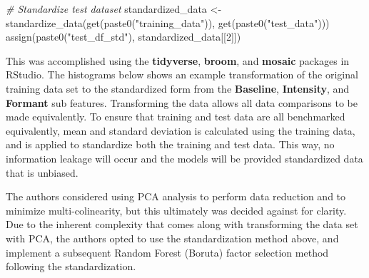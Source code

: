 \documentclass[
]{article}
\newenvironment{Shaded}{\begin{snugshade}}{\end{snugshade}}
\newcommand{\CommentTok}[1]{\textcolor[rgb]{0.56,0.35,0.01}{\textit{#1}}}
\newcommand{\DecValTok}[1]{\textcolor[rgb]{0.00,0.00,0.81}{#1}}
\newcommand{\FunctionTok}[1]{\textcolor[rgb]{0.00,0.00,0.00}{#1}}
\newcommand{\NormalTok}[1]{#1}
\newcommand{\OtherTok}[1]{\textcolor[rgb]{0.56,0.35,0.01}{#1}}
\newcommand{\StringTok}[1]{\textcolor[rgb]{0.31,0.60,0.02}{#1}}
\begin{document}
\begin{Shaded}
\begin{Highlighting}[]
\CommentTok{\# Standardize test dataset}
\NormalTok{  standardized\_data }\OtherTok{\textless{}{-}} \FunctionTok{standardize\_data}\NormalTok{(}\FunctionTok{get}\NormalTok{(}\FunctionTok{paste0}\NormalTok{(}\StringTok{"training\_data"}\NormalTok{)), }\FunctionTok{get}\NormalTok{(}\FunctionTok{paste0}\NormalTok{(}\StringTok{"test\_data"}\NormalTok{)))}
  \FunctionTok{assign}\NormalTok{(}\FunctionTok{paste0}\NormalTok{(}\StringTok{"test\_df\_std"}\NormalTok{), standardized\_data[[}\DecValTok{2}\NormalTok{]])}
\end{Highlighting}
\end{Shaded}

This was accomplished using the \textbf{tidyverse}, \textbf{broom}, and \textbf{mosaic} packages in RStudio. The histograms below shows an example transformation of the original training data set to the standardized form from the \textbf{Baseline}, \textbf{Intensity}, and \textbf{Formant} sub features. Transforming the data allows all data comparisons to be made equivalently. To ensure that training and test data are all benchmarked equivalently, mean and standard deviation is calculated using the training data, and is applied to standardize both the training and test data. This way, no information leakage will occur and the models will be provided standardized data that is unbiased.

The authors considered using PCA analysis to perform data reduction and to minimize multi-colinearity, but this ultimately was decided against for clarity. Due to the inherent complexity that comes along with transforming the data set with PCA, the authors opted to use the standardization method above, and implement a subsequent Random Forest (Boruta) factor selection method following the standardization.
\end{document}

